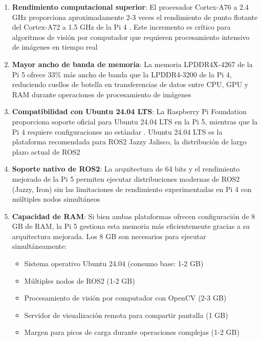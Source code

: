 \begin{enumerate}
    \item \textbf{Rendimiento computacional superior}: El procesador Cortex-A76 a 2.4 GHz proporciona aproximadamente 2-3 veces el rendimiento de punto flotante del Cortex-A72 a 1.5 GHz de la Pi 4 \cite{RaspberryPi2023Benchmarks}. Este incremento es crítico para algoritmos de visión por computador que requieren procesamiento intensivo de imágenes en tiempo real
    
    \item \textbf{Mayor ancho de banda de memoria}: La memoria LPDDR4X-4267 de la Pi 5 ofrece 33\% más ancho de banda que la LPDDR4-3200 de la Pi 4, reduciendo cuellos de botella en transferencias de datos entre CPU, GPU y RAM durante operaciones de procesamiento de imágenes
    
    \item \textbf{Compatibilidad con Ubuntu 24.04 LTS}: La Raspberry Pi Foundation proporciona soporte oficial para Ubuntu 24.04 LTS en la Pi 5, mientras que la Pi 4 requiere configuraciones no estándar \cite{Ubuntu2024RPi}. Ubuntu 24.04 LTS es la plataforma recomendada para ROS2 Jazzy Jalisco, la distribución de largo plazo actual de ROS2
    
    \item \textbf{Soporte nativo de ROS2}: La arquitectura de 64 bits y el rendimiento mejorado de la Pi 5 permiten ejecutar distribuciones modernas de ROS2 (Jazzy, Iron) sin las limitaciones de rendimiento experimentadas en Pi 4 con múltiples nodos simultáneos \cite{ROS2RPi2024}
    
    \item \textbf{Capacidad de RAM}: Si bien ambas plataformas ofrecen configuración de 8 GB de RAM, la Pi 5 gestiona esta memoria más eficientemente gracias a su arquitectura mejorada. Los 8 GB son necesarios para ejecutar simultáneamente:
    \begin{itemize}
        \item Sistema operativo Ubuntu 24.04 (consumo base: 1-2 GB)
        \item Múltiples nodos de ROS2 (1-2 GB)
        \item Procesamiento de visión por computador con OpenCV (2-3 GB)
        \item Servidor de visualización remota para compartir pantalla (1 GB)
        \item Margen para picos de carga durante operaciones complejas (1-2 GB)
    \end{itemize}
    

\end{enumerate}
